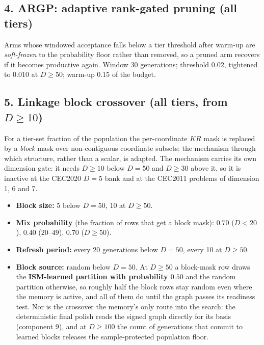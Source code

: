 \documentclass[11pt,a4paper]{article}
\begin{document}
\subsection{4. ARGP: adaptive rank-gated pruning (all tiers)}

Arms whose windowed acceptance falls below a tier threshold after warm-up are
\emph{soft-frozen} to the probability floor rather than removed, so a pruned
arm recovers if it becomes productive again. Window $30$ generations; threshold
$0.02$, tightened to $0.010$ at $D\geq50$; warm-up $0.15$ of the budget.

\subsection{5. Linkage block crossover (all tiers, from $D\geq10$)}

For a tier-set fraction of the population the per-coordinate $KR$ mask is
replaced by a \emph{block} mask over non-contiguous coordinate subsets: the
mechanism through which structure, rather than a scalar, is adapted. The
mechanism carries its own dimension gate: it needs $D\geq10$ below $D=50$ and
$D\geq30$ above it, so it is inactive at the CEC2020 $D{=}5$ bank and at the
CEC2011 problems of dimension 1, 6 and 7.

\begin{itemize}[leftmargin=1.2em, itemsep=1pt, topsep=3pt]
\item \textbf{Block size:} 5 below $D=50$, 10 at $D\geq50$.
\item \textbf{Mix probability} (the fraction of rows that get a block mask):
      $0.70$ ($D<20$), $0.40$ ($20$--$49$), $0.70$ ($D\geq50$).
\item \textbf{Refresh period:} every 20 generations below $D=50$, every 10 at
      $D\geq50$.
\item \textbf{Block source:} random below $D=50$. At $D\geq50$ a block-mask
      row draws the \textbf{ISM-learned partition with probability $0.50$} and
      the random partition otherwise, so roughly half the block rows stay
      random even where the memory is active, and all of them do until the
      graph passes its readiness test. Nor is the crossover the memory's only
      route into the search: the deterministic final polish reads the signed graph
      directly for its basis (component 9), and at $D\geq100$ the count of
      generations that commit to learned blocks releases the sample-protected
      population floor.
\end{itemize}
\end{document}
